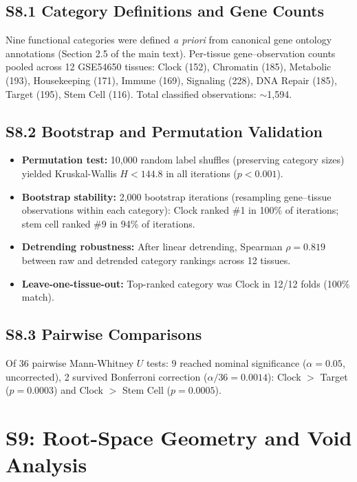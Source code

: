 \documentclass[11pt,a4paper]{article}
\begin{document}
\subsection{S8.1 Category Definitions and Gene Counts}

Nine functional categories were defined \textit{a priori} from canonical gene ontology annotations (Section 2.5 of the main text). Per-tissue gene--observation counts pooled across 12 GSE54650 tissues: Clock (152), Chromatin (185), Metabolic (193), Housekeeping (171), Immune (169), Signaling (228), DNA Repair (185), Target (195), Stem Cell (116). Total classified observations: $\sim$1,594.

\subsection{S8.2 Bootstrap and Permutation Validation}

\begin{itemize}
    \item \textbf{Permutation test:} 10,000 random label shuffles (preserving category sizes) yielded Kruskal-Wallis $H < 144.8$ in all iterations ($p < 0.001$).
    \item \textbf{Bootstrap stability:} 2,000 bootstrap iterations (resampling gene--tissue observations within each category): Clock ranked \#1 in 100\% of iterations; stem cell ranked \#9 in 94\% of iterations.
    \item \textbf{Detrending robustness:} After linear detrending, Spearman $\rho = 0.819$ between raw and detrended category rankings across 12 tissues.
    \item \textbf{Leave-one-tissue-out:} Top-ranked category was Clock in 12/12 folds (100\% match).
\end{itemize}

\subsection{S8.3 Pairwise Comparisons}

Of 36 pairwise Mann-Whitney $U$ tests: 9 reached nominal significance ($\alpha = 0.05$, uncorrected), 2 survived Bonferroni correction ($\alpha/36 = 0.0014$): Clock $>$ Target ($p = 0.0003$) and Clock $>$ Stem Cell ($p = 0.0005$).

\section{S9: Root-Space Geometry and Void Analysis}
\end{document}
